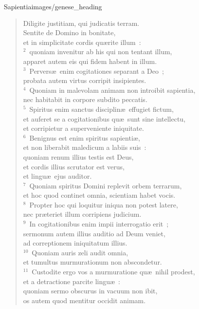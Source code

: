 {Sapientia}{images/genese_heading}

\begin{flushleft}\begin{verse}\vspace{-11pt}Diligite justitiam, qui judicatis terram.\\ Sentite de Domino in bonitate,\\ et in simplicitate cordis qu\ae rite illum~:\\
${}^{2}$~quoniam invenitur ab his qui non tentant illum,\\ apparet autem eis qui fidem habent in illum.\\
${}^{3}$~Pervers\ae\ enim cogitationes separant a Deo~;\\ probata autem virtus corripit insipientes.\\
${}^{4}$~Quoniam in malevolam animam non introibit sapientia,\\ nec habitabit in corpore subdito peccatis.\\
${}^{5}$~Spiritus enim sanctus disciplin\ae\ effugiet fictum,\\ et auferet se a cogitationibus qu\ae\ sunt sine intellectu,\\ et corripietur a superveniente iniquitate.\\
${}^{6}$~Benignus est enim spiritus sapienti\ae ,\\ et non liberabit maledicum a labiis suis~:\\ quoniam renum illius testis est Deus,\\ et cordis illius scrutator est verus,\\ et lingu\ae\ ejus auditor.\\
${}^{7}$~Quoniam spiritus Domini replevit orbem terrarum,\\ et hoc quod continet omnia, scientiam habet vocis.\\
${}^{8}$~Propter hoc qui loquitur iniqua non potest latere,\\ nec pr\ae teriet illum corripiens judicium.\\
${}^{9}$~In cogitationibus enim impii interrogatio erit~;\\ sermonum autem illius auditio ad Deum veniet,\\ ad correptionem iniquitatum illius.\\
${}^{10}$~Quoniam auris zeli audit omnia,\\ et tumultus murmurationum non abscondetur.\\
${}^{11}$~Custodite ergo vos a murmuratione qu\ae\ nihil prodest,\\ et a detractione parcite lingu\ae~:\\ quoniam sermo obscurus in vacuum non ibit,\\ os autem quod mentitur occidit animam.\end{verse}\end{flushleft}



